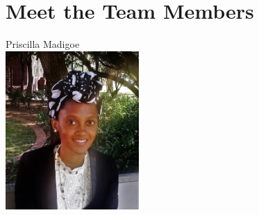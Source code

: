 \documentclass[a4paper,12pt]{article}
\begin{document}
\newpage
\section{Meet the Team Members}



\begin{center}
{\Large Priscilla {Madigoe}} \\[0.3cm]
\includegraphics[width= 2in]{P.jpg}\\[0.4cm] 
\end{center}
\end{document}
